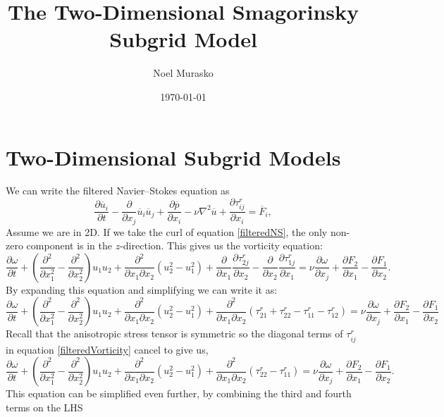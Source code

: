 \documentclass[11pt,a4paper]{article}
\author{Noel Murasko}
\title{The Two-Dimensional Smagorinsky Subgrid Model}
\date{\today}
\begin{document}
\maketitle
\noindent 
\section{Two-Dimensional Subgrid Models}
We can write the filtered Navier--Stokes equation as
\begin{equation}\label{filteredNS}
\frac{\partial \overline{u}_i}{\partial t} - \frac{\partial }{\partial x_j}\overline{u}_i\overline{u}_j+\frac{\partial \overline{p}}{\partial x_i}- \nu \nabla^2 \overline{u} +\frac{\partial \tau_{ij}^r}{\partial x_i}= \overline{F}_i,
\end{equation}
Assume we are in 2D. If we take the curl of equation \ref{filteredNS}, the only non-zero component is in the $z$-direction. This gives us the vorticity equation:
$$\frac{\partial \omega}{\partial t}  + \left(\frac{\partial^2}{\partial x_1^2} - \frac{\partial^2}{\partial x_2^2}\right)u_1u_2 +\frac{\partial^2}{\partial x_1\partial x_2}\left(u_2^2-u_1^2\right)+ \frac{\partial }{\partial x_1}\frac{\partial \tau_{2j}^r}{\partial x_2} - \frac{\partial }{\partial x_2}\frac{\partial \tau_{1j}^r}{\partial x_1}= \nu \frac{\partial \omega}{\partial x_j}+\frac{\partial F_2}{\partial x_1} - \frac{\partial F_1}{\partial x_2}.$$
By expanding this equation and simplifying we can write it as:
\begin{equation}\label{filteredVorticity}
\frac{\partial \omega}{\partial t}  + \left(\frac{\partial^2}{\partial x_1^2} - \frac{\partial^2}{\partial x_2^2}\right)u_1u_2 +\frac{\partial^2}{\partial x_1\partial x_2}\left(u_2^2-u_1^2\right)+ \frac{\partial^2 }{\partial x_1\partial x_2}\left( \tau_{21}^r+\tau_{22}^r-  \tau_{11}^r-\tau_{12}^r\right)= \nu \frac{\partial \omega}{\partial x_j}+\frac{\partial F_2}{\partial x_1} - \frac{\partial F_1}{\partial x_2}
\end{equation}
Recall that the anisotropic stress tensor is symmetric so the diagonal terms of $\tau_{ij}^r$ in equation \ref{filteredVorticity} cancel to give us,
$$\frac{\partial \omega}{\partial t}  + \left(\frac{\partial^2}{\partial x_1^2} - \frac{\partial^2}{\partial x_2^2}\right)u_1u_2 +\frac{\partial^2}{\partial x_1\partial x_2}\left(u_2^2-u_1^2\right)+ \frac{\partial^2 }{\partial x_1\partial x_2}\left( \tau_{22}^r-  \tau_{11}^r\right)= \nu \frac{\partial \omega}{\partial x_j}+\frac{\partial F_2}{\partial x_1} - \frac{\partial F_1}{\partial x_2}.$$
This equation can be simplified even further, by combining the third and fourth terms on the LHS
\end{document}
